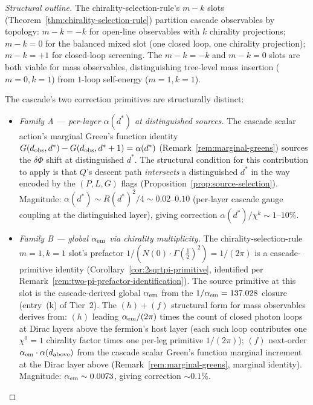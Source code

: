 \documentclass[12pt,a4paper]{article}
\begin{document}
\begin{proof}[Structural outline]
The chirality-selection-rule's $m-k$ slots
(Theorem~\ref{thm:chirality-selection-rule}) partition cascade
observables by topology: $m-k = -k$ for open-line observables with
$k$ chirality projections; $m-k = 0$ for the balanced mixed slot
(one closed loop, one chirality projection); $m-k = +1$ for
closed-loop screening. The $m-k = -k$ and $m-k = 0$ slots are
both viable for mass observables, distinguishing tree-level mass
insertion ($m=0, k=1$) from $1$-loop self-energy ($m=1, k=1$).

The cascade's two correction primitives are structurally distinct:
\begin{itemize}[nosep]
\item \emph{Family A — per-layer $\alpha(d^*)$ at distinguished
sources.} The cascade scalar action's marginal Green's function
identity $G(d_{\rm obs}, d^*) - G(d_{\rm obs}, d^*+1) = \alpha(d^*)$
(Remark~\ref{rem:marginal-greens}) sources the $\delta\Phi$ shift
at distinguished $d^*$. The structural condition for this
contribution to apply is that $Q$'s descent path \emph{intersects}
a distinguished $d^*$ in the way encoded by the $(P, L, G)$ flags
(Proposition~\ref{prop:source-selection}). Magnitude:
$\alpha(d^*) \sim R(d^*)^2/4 \sim 0.02$--$0.10$ (per-layer cascade
gauge coupling at the distinguished layer), giving correction
$\alpha(d^*)/\chi^k \sim 1$--$10\%$.
\item \emph{Family B — global $\alpha_{\rm em}$ via chirality
multiplicity.} The chirality-selection-rule $m=1, k=1$ slot's
prefactor $1/(N(0)\cdot\Gamma(\tfrac{1}{2})^2) = 1/(2\pi)$ is a
cascade-primitive identity (Corollary~\ref{cor:2sqrtpi-primitive},
identified per Remark~\ref{rem:two-pi-prefactor-identification}).
The source primitive at this slot is the cascade-derived global
$\alpha_{\rm em}$ from the $1/\alpha_{\rm em} = 137.028$ closure
(entry~(k) of Tier~2). The $(h)+(f)$ structural form for mass
observables derives from: $(h)$ leading $\alpha_{\rm em}/(2\pi)$
times the count of closed photon loops at Dirac layers above the
fermion's host layer (each such loop contributes one $\chi^0 = 1$
chirality factor times one per-leg primitive $1/(2\pi)$); $(f)$
next-order $\alpha_{\rm em}\cdot\alpha(d_{\rm above})$ from the
cascade scalar Green's function marginal increment at the Dirac
layer above (Remark~\ref{rem:marginal-greens}, marginal identity).
Magnitude: $\alpha_{\rm em} \sim 0.0073$, giving correction
$\sim 0.1\%$.


\end{itemize}
\end{proof}
\end{document}
